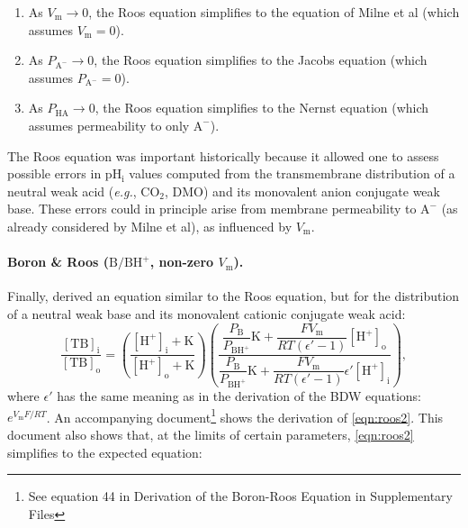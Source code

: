 \documentclass[fleqn,10pt]{physiome}
\begin{document}
\begin{enumerate}[noitemsep] 
\item As $V_\mathrm{m} \rightarrow 0$, the Roos equation simplifies to the equation of Milne et al (which assumes $V_\mathrm{m}=0$).

\item As $P_\mathrm{A^-} \rightarrow 0$, the Roos equation simplifies to the Jacobs equation (which assumes $P_\mathrm{A^-}=0$).

\item As $P_\mathrm{HA} \rightarrow 0$, the Roos equation simplifies to the Nernst equation (which assumes permeability to only $\mathrm{A^-}$).
\end{enumerate}

The Roos equation was important historically because it allowed one to assess possible errors in $\mathrm{pH_i}$ values computed from the transmembrane distribution of a neutral weak acid (\emph{e.g.}, $\mathrm{CO_2}$, DMO) and its monovalent anion conjugate weak base. These errors could in principle arise from membrane permeability to $\mathrm{A^-}$ (as already considered by Milne et al), as influenced by $V_\mathrm{m}$.

\paragraph{Boron \& Roos ($\mathrm{B}/\mathrm{BH^+}$, non-zero $V_\mathrm{m}$).}

Finally, \cite{boron1976comparison} derived an equation similar to the Roos equation, but for the distribution of a neutral weak base and its monovalent cationic conjugate weak acid:
\begin{equation}
\dfrac{\mathrm{[TB]_i}}{\mathrm{[TB]_o}}=\left(\dfrac{\mathrm{[H^+]_i}+\mathrm{K}}{\mathrm{[H^+]_o}+\mathrm{K}}\right)\left( \dfrac{\dfrac{P_\mathrm{B}}{P_\mathrm{BH^+}}\mathrm{K}+\dfrac{FV_\mathrm{m}}{RT(\epsilon '-1)}\mathrm{[H^+]_o}}{\dfrac{P_\mathrm{B}}{P_\mathrm{BH^+}}\mathrm{K}+\dfrac{FV_\mathrm{m}}{RT(\epsilon '-1)}\epsilon '\mathrm{[H^+]_i}}\right),
\label{eqn:roos2}
\end{equation}
where $\epsilon '$ has the same meaning as in the derivation of the BDW equations: $e^{V_\mathrm{m}F/RT}$. An accompanying document\footnote{See equation 44 in Derivation of the Boron-Roos Equation in Supplementary Files} shows the derivation of \autoref{eqn:roos2}. This document also shows that, at the limits of certain parameters, \autoref{eqn:roos2} simplifies to the expected equation:
\end{document}
